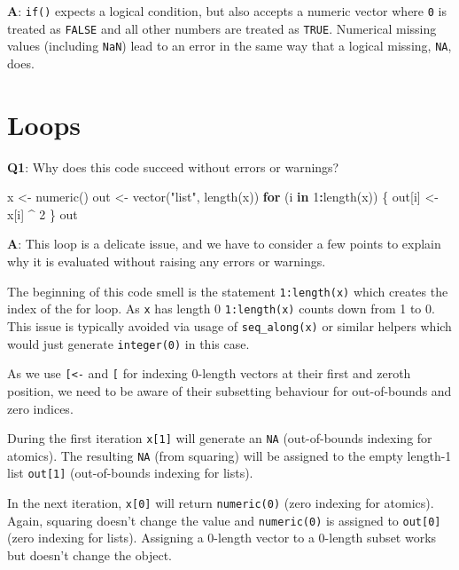 \documentclass[
]{krantz}
\makeatletter
\newenvironment{Shaded}{\begin{snugshade}}{\end{snugshade}}
\newcommand{\ControlFlowTok}[1]{\textcolor[rgb]{0.13,0.29,0.53}{\textbf{#1}}}
\newcommand{\DecValTok}[1]{\textcolor[rgb]{0.00,0.00,0.81}{#1}}
\newcommand{\KeywordTok}[1]{\textcolor[rgb]{0.13,0.29,0.53}{\textbf{#1}}}
\newcommand{\NormalTok}[1]{#1}
\newcommand{\OperatorTok}[1]{\textcolor[rgb]{0.81,0.36,0.00}{\textbf{#1}}}
\newcommand{\StringTok}[1]{\textcolor[rgb]{0.31,0.60,0.02}{#1}}
\newenvironment{kframe}{%
\medskip{}
\setlength{\fboxsep}{.8em}
 \def\at@end@of@kframe{}%
 \ifinner\ifhmode%
  \def\at@end@of@kframe{\end{minipage}}%
  \begin{minipage}{\columnwidth}%
 \fi\fi%
 \def\FrameCommand##1{\hskip\@totalleftmargin \hskip-\fboxsep
 \colorbox{shadecolor}{##1}\hskip-\fboxsep
     \hskip-\linewidth \hskip-\@totalleftmargin \hskip\columnwidth}%
 \MakeFramed {\advance\hsize-\width
   \@totalleftmargin\z@ \linewidth\hsize
   \@setminipage}}%
 {\par\unskip\endMakeFramed%
 \at@end@of@kframe}
\renewenvironment{Shaded}{\begin{kframe}}{\end{kframe}}
\renewcommand{\KeywordTok} [1]{\textcolor[rgb]{0.00,0.44,0.13}{{#1}}}
\renewcommand{\DecValTok}  [1]{\textcolor[rgb]{0.25,0.63,0.44}{{#1}}}
\renewcommand{\StringTok}  [1]{\textcolor[rgb]{0.25,0.44,0.63}{{#1}}}
\renewcommand{\NormalTok}  [1]{{#1}}
\makeatother
\begin{document}
\textbf{{A}}: \texttt{if()} expects a logical condition, but also accepts a numeric vector where \texttt{0} is treated as \texttt{FALSE} and all other numbers are treated as \texttt{TRUE}. Numerical missing values (including \texttt{NaN}) lead to an error in the same way that a logical missing, \texttt{NA}, does.

\hypertarget{loops}{%
\section{Loops}\label{loops}}

\textbf{{Q1}}: Why does this code succeed without errors or warnings?

\begin{Shaded}
\begin{Highlighting}[]
\NormalTok{x <-}\StringTok{ }\KeywordTok{numeric}\NormalTok{()}
\NormalTok{out <-}\StringTok{ }\KeywordTok{vector}\NormalTok{(}\StringTok{"list"}\NormalTok{, }\KeywordTok{length}\NormalTok{(x))}
\ControlFlowTok{for}\NormalTok{ (i }\ControlFlowTok{in} \DecValTok{1}\OperatorTok{:}\KeywordTok{length}\NormalTok{(x)) \{}
\NormalTok{  out[i] <-}\StringTok{ }\NormalTok{x[i] }\OperatorTok{^}\StringTok{ }\DecValTok{2}
\NormalTok{\}}
\NormalTok{out}
\end{Highlighting}
\end{Shaded}

\textbf{{A}}: This loop is a delicate issue, and we have to consider a few points to explain why it is evaluated without raising any errors or warnings.

The beginning of this code smell is the statement \texttt{1:length(x)} which creates the index of the for loop. As \texttt{x} has length 0 \texttt{1:length(x)} counts down from 1 to 0. This issue is typically avoided via usage of \texttt{seq\_along(x)} or similar helpers which would just generate \texttt{integer(0)} in this case.

As we use \texttt{{[}\textless{}-} and \texttt{{[}} for indexing 0-length vectors at their first and zeroth position, we need to be aware of their subsetting behaviour for out-of-bounds and zero indices.

During the first iteration \texttt{x{[}1{]}} will generate an \texttt{NA} (out-of-bounds indexing for atomics). The resulting \texttt{NA} (from squaring) will be assigned to the empty length-1 list \texttt{out{[}1{]}} (out-of-bounds indexing for lists).

In the next iteration, \texttt{x{[}0{]}} will return \texttt{numeric(0)} (zero indexing for atomics). Again, squaring doesn't change the value and \texttt{numeric(0)} is assigned to \texttt{out{[}0{]}} (zero indexing for lists). Assigning a 0-length vector to a 0-length subset works but doesn't change the object.
\end{document}
